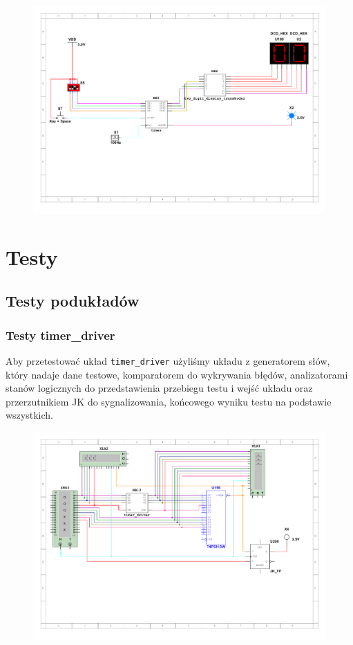 \documentclass[a4paper]{article}
\begin{document}
\begin{figure}[H]
    \centering
    \includegraphics[width=\textwidth]{showup_scheme.pdf}
\end{figure}


\pagebreak
\section{Testy}
\subsection{Testy podukładów}
\subsubsection{Testy timer\_driver}
Aby przetestować układ \verb|timer_driver| użyliśmy układu z generatorem słów, który nadaje dane testowe,
komparatorem do wykrywania błędów, analizatorami stanów logicznych do przedstawienia przebiegu testu i wejść układu oraz
przerzutnikiem JK do sygnalizowania, końcowego wyniku testu na podstawie wszystkich.

\begin{figure}[H]
    \centering
    \includegraphics[width=\textwidth]{component_tests_driver.pdf}
\end{figure}
\end{document}
